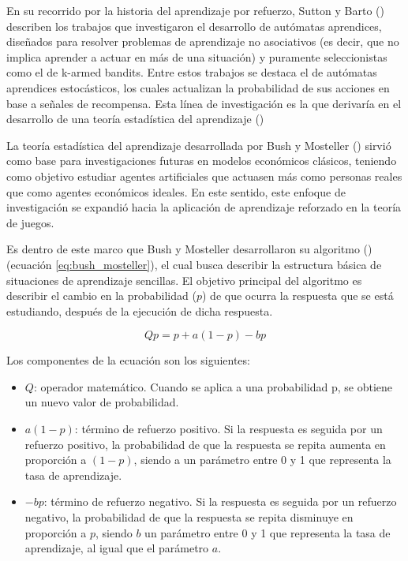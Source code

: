 \documentclass[12pt,a4paper]{article}
\begin{document}
En su recorrido por la historia del aprendizaje por refuerzo, Sutton y Barto 
(\citeyear{sutton1998reinforcement}) describen los trabajos que investigaron 
el desarrollo de autómatas aprendices, diseñados para resolver problemas de 
aprendizaje no asociativos (es decir, que no implica aprender a actuar en más 
de una situación) y puramente seleccionistas como el de k-armed bandits. Entre estos
trabajos se destaca el de autómatas aprendices estocásticos, los cuales actualizan la 
probabilidad de sus acciones en base a señales de recompensa. Esta línea de investigación
es la que derivaría en el desarrollo de una teoría estadística del aprendizaje (\cite{bush1955stochastic})

La teoría estadística del aprendizaje desarrollada por Bush y Mosteller 
(\citeyear{bush1955stochastic}) sirvió como base para investigaciones futuras en modelos 
económicos clásicos, teniendo como objetivo estudiar agentes artificiales que actuasen más 
como personas reales que como agentes económicos ideales. En este sentido, este enfoque de 
investigación se expandió hacia la aplicación de aprendizaje reforzado en la teoría de juegos.

Es dentro de este marco que Bush y Mosteller desarrollaron su algoritmo (\citeyear
{bush1951mathematical}) (ecuación \ref{eq:bush_mosteller}), el cual busca describir la estructura 
básica de situaciones de aprendizaje sencillas. El objetivo principal del algoritmo es describir 
el cambio en la probabilidad ($p$) de que ocurra la respuesta que se está estudiando, después de la 
ejecución de dicha respuesta.

\begin{equation}
Qp = p + a(1-p)-bp
\label{eq:bush_mosteller}
\end{equation}

Los componentes de la ecuación son los siguientes:
\begin{itemize}
\item $Q$: operador matemático. Cuando se aplica a una probabilidad p, se obtiene 
un nuevo valor de probabilidad.
\item $a(1-p)$: término de refuerzo positivo. Si la respuesta es seguida por un
refuerzo positivo, la probabilidad de que la respuesta se repita aumenta en
proporción a $(1-p)$, siendo a un parámetro entre 0 y 1 que representa la
tasa de aprendizaje.
\item $-bp$: término de refuerzo negativo. Si la respuesta es seguida por un
refuerzo negativo, la probabilidad de que la respuesta se repita disminuye en
proporción a $p$, siendo $b$ un parámetro entre 0 y 1 que representa la
tasa de aprendizaje, al igual que el parámetro $a$.
\end{itemize}
\end{document}
